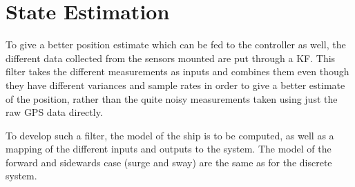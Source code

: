 \chapter{State Estimation}
To give a better position estimate which can be fed to the controller as well, the different data collected from the sensors mounted are put through a \ac{KF}. This filter takes the different measurements as inputs and combines them even though they have different variances and sample rates in order to give a better estimate of the position, rather than the quite noisy measurements taken using just the raw \ac{GPS} data directly.

To develop such a filter, the model of the ship is to be computed, as well as a mapping of the different inputs and outputs to the system. The model of the forward and sidewards case (surge and sway) are the same as for the discrete system.

